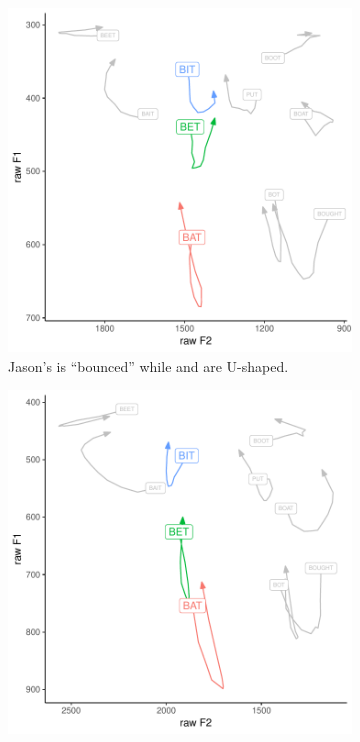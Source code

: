 \begin{figure}[tb!]
    \centering
    \hspace{\fill}
    \begin{subfigure}[t]{2.925in}
        \centering
        \includegraphics[width = \textwidth]{Figures/example_plots/30-Jason_avg_traj.pdf}
        \caption{Jason's \bat is ``bounced'' while \bet and \bit are U-shaped.}
        \label{fig:avg_traj_jason}
    \end{subfigure}
    \hspace{\fill}
    \begin{subfigure}[t]{2.925in}
        \centering
        \includegraphics[width = \textwidth]{Figures/example_plots/29-Amanda_avg_traj.pdf}

\end{subfigure}
\end{figure}
